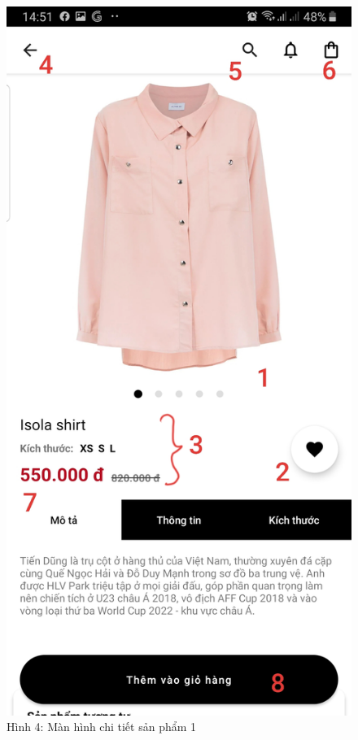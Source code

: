 \documentclass{beamer}
\begin{document}
\begin{frame}
    \begin{columns}
        \begin{figure}
            \centering
            \includegraphics[height=0.7\textheight]{images/03.png}
            \caption{\centering\tiny{Hình 4: Màn hình chi tiết sản phẩm 1}}


\end{figure}
\end{columns}
\end{frame}
\end{document}
